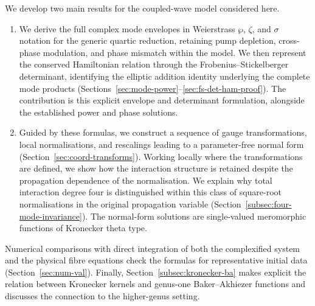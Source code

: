 \documentclass[11pt,a4paper]{article}
\numberwithin{equation}{section}
\begin{document}
We develop two main results for the coupled-wave model considered here.
\begin{enumerate}
\item We derive the full complex mode envelopes in Weierstrass $\wp$, $\zeta$, and $\sigma$ notation for the generic quartic reduction, retaining pump depletion, cross-phase modulation, and phase mismatch within the model.
We then represent the conserved Hamiltonian relation through the Frobenius--Stickelberger determinant, identifying the elliptic addition identity underlying the complete mode products (Sections~\ref{sec:mode-power}--\ref{sec:fs-det-ham-proof}).
The contribution is this explicit envelope and determinant formulation, alongside the established power and phase solutions.

\item Guided by these formulas, we construct a sequence of gauge transformations, local normalisations, and rescalings leading to a parameter-free normal form (Section~\ref{sec:coord-transforms}).
Working locally where the transformations are defined, we show how the interaction structure is retained despite the propagation dependence of the normalisation.
We explain why total interaction degree four is distinguished within this class of square-root normalisations in the original propagation variable (Section~\ref{subsec:four-mode-invariance}).
The normal-form solutions are single-valued meromorphic functions of Kronecker theta type.
\end{enumerate}

Numerical comparisons with direct integration of both the complexified system and the physical fibre equations check the formulas for representative initial data (Section~\ref{sec:num-val}).
Finally, Section~\ref{subsec:kronecker-ba} makes explicit the relation between Kronecker kernels and genus-one Baker--Akhiezer functions and discusses the connection to the higher-genus setting.

\end{document}
